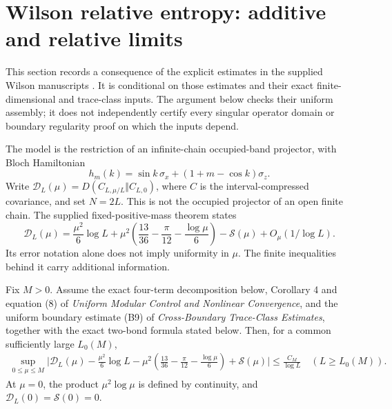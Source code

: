 \section{Wilson relative entropy: additive and relative limits}\label{sec:wilson}

This section records a consequence of the explicit estimates in the supplied Wilson manuscripts \cite{wilson}. It is conditional on those estimates and their exact finite-dimensional and trace-class inputs. The argument below checks their uniform assembly; it does not independently certify every singular operator domain or boundary regularity proof on which the inputs depend.

The model is the restriction of an infinite-chain occupied-band projector, with Bloch Hamiltonian
\[
h_m(k)=\sin k\,\sigma_x+(1+m-\cos k)\sigma_z.
\]
Write $\mathcal D_L(\mu)=D(C_{L,\mu/L}\Vert C_{L,0})$, where $C$ is the interval-compressed covariance, and set $N=2L$. This is not the occupied projector of an open finite chain. The supplied fixed-positive-mass theorem states
\[
\mathcal D_L(\mu)=\frac{\mu^2}{6}\log L+
\mu^2\left(\frac{13}{36}-\frac\pi{12}-\frac{\log\mu}{6}\right)
-\mathcal S(\mu)+O_\mu(1/\log L).
\]
Its error notation alone does not imply uniformity in $\mu$. The finite inequalities behind it carry additional information.

\begin{proposition}\label{prop:wilson}
Fix $M>0$. Assume the exact four-term decomposition below, Corollary 4 and equation (8) of \emph{Uniform Modular Control and Nonlinear Convergence}, and the uniform boundary estimate (B9) of \emph{Cross-Boundary Trace-Class Estimates}, together with the exact two-bond formula stated below. Then, for a common sufficiently large $L_0(M)$,
\begin{align*}
\sup_{0\le\mu\le M}\Bigg|\mathcal D_L(\mu)
-\frac{\mu^2}{6}\log L
-\mu^2\left(\frac{13}{36}-\frac\pi{12}-\frac{\log\mu}{6}\right)
+\mathcal S(\mu)\Bigg|
\le \frac{C_M}{\log L}\quad(L\ge L_0(M)).
\end{align*}
At $\mu=0$, the product $\mu^2\log\mu$ is defined by continuity, and $\mathcal D_L(0)=\mathcal S(0)=0$.
\end{proposition}

